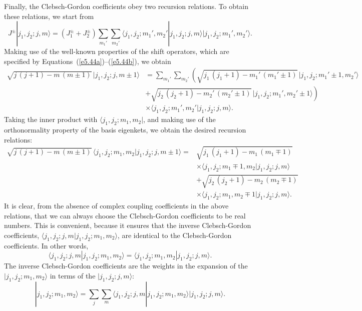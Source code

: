 Finally, the Clebsch-Gordon coefficients obey two recursion relations. 
To obtain these relations, we start from
\begin{equation}
J^{\pm} |j_1,j_2;j,m\rangle = (J_1^\pm + J_2^\pm )\sum_{m_1'}\sum_{m_2'} \langle j_1, j_2; m_1', m_2'|j_1, j_2; j, m\rangle
|j_1, j_2; m_1', m_2'\rangle.
\end{equation}
Making use of the well-known properties of the shift operators,
which are specified  by Equations~(\ref{e5.44a})--(\ref{e5.44b}), we obtain
\begin{align}
\sqrt{j\,(j+1)- m\,(m\pm 1)}\, |j_1,j_2;j,m\pm 1\rangle &=
\sum_{m_1'}\sum_{m_2'} \left( \sqrt{j_1\,(j_1+1)- m_1'\,(m_1'\pm 1)}\,
|j_1, j_2; m_1'\pm 1, m_2'\rangle\right.\nonumber\\[0.5ex]
& \left.+\sqrt{ j_2\,(j_2+1)- m_2'\,(m_2'\pm 1)}\,
|j_1, j_2; m_1', m_2'\pm 1\rangle\right) \nonumber\\[0.5ex]
 &\times\langle j_1, j_2; m_1', m_2'|j_1, j_2; j, m\rangle.
\end{align}
Taking the inner product with $\langle j_1, j_2; m_1, m_2|$, and making
use of the orthonormality property of the basis eigenkets, we obtain 
the desired recursion relations:
\begin{align}\label{e5.223}
\sqrt{j\,(j+1)- m\,(m\pm 1)}\,\langle j_1, j_2; m_1, m_2|j_1,j_2;j, m\pm 1\rangle=
&\sqrt{j_1\,(j_1+1) - m_1\,(m_1\mp 1)}\nonumber\\[0.5ex]
&\times\langle j_1, j_2; m_1\mp 1, m_2|j_1,j_2;j, m\rangle\nonumber \\[0.5ex]
&+ \sqrt{j_2\,(j_2+1) - m_2\,(m_2\mp 1)}\nonumber\\[0.5ex]
&\times\langle j_1, j_2; m_1, m_2\mp 1|j_1,j_2;j, m\rangle.
\end{align}
It is clear, from the absence of complex coupling coefficients in the above relations,
that we can always choose the Clebsch-Gordon coefficients to be real numbers.
This is  convenient, because it ensures that the inverse Clebsch-Gordon
coefficients, $\langle j_1, j_2; j, m|j_1, j_2; m_1, m_2\rangle$, are
identical to the Clebsch-Gordon coefficients. In other words,
\begin{equation}
\langle j_1, j_2; j, m|j_1, j_2; m_1, m_2\rangle = 
\langle j_1, j_2; m_1, m_2|j_1, j_2; j, m\rangle.
\end{equation}
The inverse Clebsch-Gordon coefficients are the weights in the expansion
of the $|j_1,j_2; m_1, m_2\rangle$ in terms of the $|j_1, j_2; j,m\rangle$:
\begin{equation}
|j_1,j_2; m_1,m_2\rangle = \sum_{j}\sum_m \langle j_1, j_2; j, m|j_1, j_2; m_1, m_2\rangle |j_1,j_2; j,m\rangle.
\end{equation}

